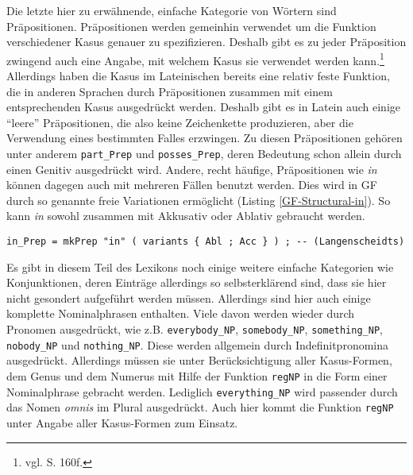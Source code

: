 \documentclass[fontsize=12pt,abstract=on,titlepage,bibliography=totoc,ngerman,listof=totoc]{scrreprt}
\begin{document}
Die letzte hier zu erwähnende, einfache Kategorie von Wörtern sind Präpositionen. Präpositionen werden gemeinhin verwendet um die Funktion verschiedener Kasus genauer zu spezifizieren. Deshalb gibt es zu jeder Präposition zwingend auch eine Angabe, mit welchem Kasus sie verwendet werden kann.\footnote{vgl. \cite{BAYER-LINDAUER1994} S. 160f.} Allerdings haben die Kasus im Lateinischen bereits eine relativ feste Funktion, die in anderen Sprachen durch Präpositionen zusammen mit einem entsprechenden Kasus ausgedrückt werden. Deshalb gibt es in Latein auch einige ``leere'' Präpositionen, die also keine Zeichenkette produzieren, aber die Verwendung eines bestimmten Falles erzwingen. Zu diesen Präpositionen gehören unter anderem \texttt{part\_Prep} und \texttt{posses\_Prep}, deren Bedeutung schon allein durch einen Genitiv ausgedrückt wird. Andere, recht häufige, Präpositionen wie \textit{in} können dagegen auch mit mehreren Fällen benutzt werden. Dies wird in GF durch so genannte freie Variationen ermöglicht (Listing \ref{GF-Structural-in}). So kann \textit{in} sowohl zusammen mit Akkusativ oder Ablativ gebraucht werden.
\begin{lstlisting}[float=ht,label={GF-Structural-in},caption={Beispiel für freie Variation}]
in_Prep = mkPrep "in" ( variants { Abl ; Acc } ) ; -- (Langenscheidts)
\end{lstlisting}
Es gibt in diesem Teil des Lexikons noch einige weitere einfache Kategorien wie Konjunktionen, deren Einträge allerdings so selbsterklärend sind, dass sie hier nicht gesondert aufgeführt werden müssen.
Allerdings sind hier auch einige komplette Nominalphrasen enthalten. Viele davon werden wieder durch Pronomen ausgedrückt, wie z.B. \texttt{everybody\_NP}, \texttt{somebody\_NP}, \texttt{something\_NP}, \texttt{nobody\_NP} und \texttt{nothing\_NP}. Diese werden allgemein durch Indefinitpronomina ausgedrückt. Allerdings müssen sie unter Berücksichtigung aller Kasus-Formen, dem Genus und dem Numerus mit Hilfe der Funktion \texttt{regNP} in die Form einer Nominalphrase gebracht werden. Lediglich \texttt{everything\_NP} wird passender durch das Nomen \textit{omnis} im Plural ausgedrückt. Auch hier kommt die Funktion \texttt{regNP} unter Angabe aller Kasus-Formen zum Einsatz.
\FloatBarrier
\end{document}
